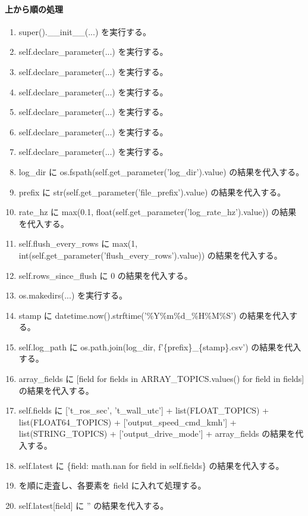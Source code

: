 \documentclass[a4paper,11pt]{article}
\begin{document}
            \paragraph{上から順の処理}
            \begin{enumerate}[leftmargin=1.8em]
            \item super().\_\_init\_\_(...) を実行する。
\item self.declare\_parameter(...) を実行する。
\item self.declare\_parameter(...) を実行する。
\item self.declare\_parameter(...) を実行する。
\item self.declare\_parameter(...) を実行する。
\item self.declare\_parameter(...) を実行する。
\item self.declare\_parameter(...) を実行する。
\item log\_dir に os.fspath(self.get\_parameter('log\_dir').value) の結果を代入する。
\item prefix に str(self.get\_parameter('file\_prefix').value) の結果を代入する。
\item rate\_hz に max(0.1, float(self.get\_parameter('log\_rate\_hz').value)) の結果を代入する。
\item self.flush\_every\_rows に max(1, int(self.get\_parameter('flush\_every\_rows').value)) の結果を代入する。
\item self.rows\_since\_flush に 0 の結果を代入する。
\item os.makedirs(...) を実行する。
\item stamp に datetime.now().strftime('\%Y\%m\%d\_\%H\%M\%S') の結果を代入する。
\item self.log\_path に os.path.join(log\_dir, f'\{prefix\}\_\{stamp\}.csv') の結果を代入する。
\item array\_fields に [field for fields in ARRAY\_TOPICS.values() for field in fields] の結果を代入する。
\item self.fields に ['t\_ros\_sec', 't\_wall\_utc'] + list(FLOAT\_TOPICS) + list(FLOAT64\_TOPICS) + ['output\_speed\_cmd\_kmh'] + list(STRING\_TOPICS) + ['output\_drive\_mode'] + array\_fields の結果を代入する。
\item self.latest に \{field: math.nan for field in self.fields\} の結果を代入する。
\item ['t\_wall\_utc', *STRING\_TOPICS, 'output\_drive\_mode'] を順に走査し、各要素を field に入れて処理する。
\item   self.latest[field] に '' の結果を代入する。

\end{enumerate}
\end{document}
